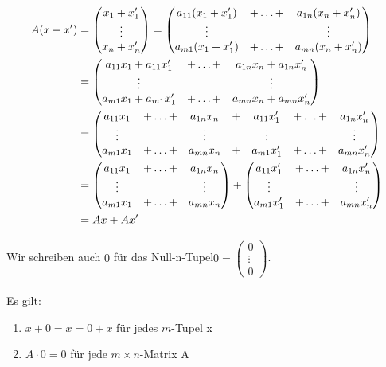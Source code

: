 \begin{align*}
 A(x+x') &= 
\begin{pmatrix}
x_1  +  x'_1 \\
\vdots \\
x_n + x'_n \\
\end{pmatrix} =
\begin{pmatrix}
a_{11}(x_1 + x'_1) & +  \ldots  + & a_{1n}(x_n + x'_n) \\
\vdots &  & \vdots \\
a_{m1}(x_1 + x'_1) & +  \ldots  + & a_{mn}(x_n + x'_n) 
\end{pmatrix} 
\\
&= 
\begin{pmatrix}
a_{11} x_1  +  a_{11} x'_1 & +  \ldots  + & a_{1n} x_n + a_{1n} x'_n\\
\vdots &   &   \vdots  \\
a_{m1} x_1  +  a_{m1} x'_1 & +  \ldots  + & a_{mn} x_n + a_{mn} x'_n
\end{pmatrix} \\
&=
\setcounter{MaxMatrixCols}{12}
\begin{pmatrix}
a_{11} x_1 & +  \ldots  + & a_{1n} x_n & + & a_{11}x'_1 & +  \ldots  + & a_{1n}x'_n\\
\vdots &  & \vdots & & \vdots &  & \vdots \\
a_{m1} x_1 & +  \ldots  + & a_{mn} x_n & + & a_{m1}x'_1 & +  \ldots  + & a_{mn}x'_n
\end{pmatrix} \\
&=
\begin{pmatrix}
a_{11} x_1 & +  \ldots  + & a_{1n} x_n \\
\vdots &  & \vdots \\
a_{m1} x_1 & +  \ldots  + & a_{mn} x_n 
\end{pmatrix}
+
\begin{pmatrix}
a_{11}x'_1 & +  \ldots  + & a_{1n}x'_n\\
\vdots &  & \vdots  \\
a_{m1}x'_1 & +  \ldots  + & a_{mn}x'_n
\end{pmatrix} \\
&=
Ax + Ax'
\end{align*}

Wir schreiben auch \(0\) für das \grqq Null-n-Tupel\grqq \enspace \(0= \begin{pmatrix} 0 \\ \vdots \\ 0 \end{pmatrix} \). \\ \\
Es gilt:
\begin{enumerate}
\item 
\( x+0=x=0+x \) für jedes \(m\)-Tupel x
\item 
\(A\cdot 0=0\) für jede \(m \times n\)-Matrix A
\end{enumerate} 

